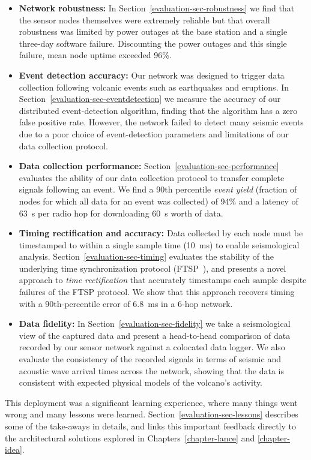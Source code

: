 \begin{itemize}

\item \textbf{Network robustness:} In Section~\ref{evaluation-sec-robustness}
we find that the sensor nodes themselves were extremely reliable but that
overall robustness was limited by power outages at the base station and a
single three-day software failure. Discounting the power outages and this
single failure, mean node uptime exceeded 96\%.

\item \textbf{Event detection accuracy:} Our network was designed to trigger
data collection following volcanic events such as earthquakes and eruptions.
In Section~\ref{evaluation-sec-eventdetection} we measure the accuracy of our
distributed event-detection algorithm, finding that the algorithm has a zero
false positive rate. However, the network failed to detect many seismic
events due to a poor choice of event-detection parameters and limitations of
our data collection protocol.

\item \textbf{Data collection performance:}
Section~\ref{evaluation-sec-performance} evaluates the ability of our data
collection protocol to transfer complete signals following an event. We find
a 90th percentile \textit{event yield} (fraction of nodes for which all data
for an event was collected) of 94\% and a latency of 63~s per radio hop for
downloading 60~s worth of data.

\item \textbf{Timing rectification and accuracy:} Data collected by each node
must be timestamped to within a single sample time (10~ms) to enable
seismological analysis. Section~\ref{evaluation-sec-timing} evaluates the
stability of the underlying time synchronization protocol (FTSP~\cite{ftsp}),
and presents a novel approach to \textit{time rectification} that accurately
timestamps each sample despite failures of the FTSP protocol. We show that
this approach recovers timing with a 90th-percentile error of 6.8~ms in a
6-hop network.

\item \textbf{Data fidelity:} In Section~\ref{evaluation-sec-fidelity} we
take a seismological view of the captured data and present a head-to-head
comparison of data recorded by our sensor network against a colocated data
logger. We also evaluate the consistency of the recorded signals in terms of
seismic and acoustic wave arrival times across the network, showing that the
data is consistent with expected physical models of the volcano's activity.

\end{itemize}

This deployment was a significant learning experience, where many things went
wrong and many lessons were learned. Section~\ref{evaluation-sec-lessons}
describes some of the take-aways in details, and links this important
feedback directly to the architectural solutions explored in
Chapters~\ref{chapter-lance} and \ref{chapter-idea}.
